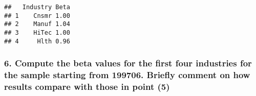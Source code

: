 \documentclass[
]{article}
\begin{document}
\begin{verbatim}
##   Industry Beta
## 1    Cnsmr 1.00
## 2    Manuf 1.04
## 3    HiTec 1.00
## 4     Hlth 0.96
\end{verbatim}

\hypertarget{compute-the-beta-values-for-the-first-four-industries-for-the-sample-starting-from-199706.-briefly-comment-on-how-results-compare-with-those-in-point-5}{%
\subsubsection{6. Compute the beta values for the first four industries
for the sample starting from 199706. Briefly comment on how results
compare with those in point
(5)}\label{compute-the-beta-values-for-the-first-four-industries-for-the-sample-starting-from-199706.-briefly-comment-on-how-results-compare-with-those-in-point-5}}
\end{document}
